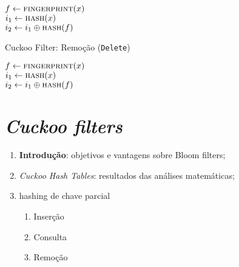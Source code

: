 \documentclass[12pt,twoside,english,brazilian]{article}
\begin{document}
\begin{enumerate}
\begin{algorithm}
        $f \leftarrow \Call{fingerprint}{x}$ \\
        $i_1 \leftarrow \Call{hash}{x}$ \\
        $i_2 \leftarrow i_1 \oplus \Call{hash}{f}$ \\
    \end{algorithm}

    \begin{algorithm}
        \caption{Cuckoo Filter: Remoção (\texttt{Delete})}\label{alg:cap}
    
        $f \leftarrow \Call{fingerprint}{x}$ \\
        $i_1 \leftarrow \Call{hash}{x}$ \\
        $i_2 \leftarrow i_1 \oplus \Call{hash}{f}$ \\
    \end{algorithm}
\end{enumerate}

\section{\textit{Cuckoo filters}}

\begin{enumerate}
    \item \textbf{Introdução}: objetivos e vantagens sobre Bloom filters;
    \item \textit{Cuckoo Hash Tables}: resultados das análises matemáticas;
    \item hashing de chave parcial
   
    \begin{enumerate}
    
        \item Inserção
        \item Consulta
        \item Remoção
        
    \end{enumerate}
\end{enumerate}

\clearpage

\nocite{*}
\printbibliography[
  title=\refname\label{bibliografia}, %
]
\end{document}
